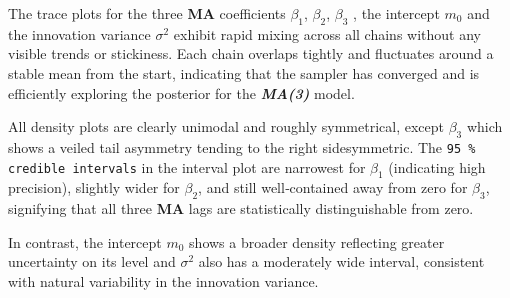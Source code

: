 \documentclass{Configuration_Files/PoliMi3i_thesis}
\begin{document}
\newpage
The trace plots for the three \textbf{\textbf{MA}} coefficients \(\beta_1\), \(\beta_2\),  \(\beta_3\) , the intercept \(m_0\) and the innovation variance \(\sigma^2\) exhibit rapid mixing across all chains without any visible trends or stickiness. Each chain overlaps tightly and fluctuates around a stable mean from the start, indicating that the sampler has converged and is efficiently exploring the posterior for the \textbf{\textit{MA(3)}} model.

All density plots are clearly unimodal and roughly symmetrical, except \(\beta_3\) which shows a veiled tail asymmetry tending to the right sidesymmetric. The \texttt{95 \% credible intervals} in the interval plot are narrowest for \(\beta_1\) (indicating high precision), slightly wider for \(\beta_2\), and still well‐contained away from zero for \(\beta_3\), signifying that all three \textbf{\textbf{MA}} lags are statistically distinguishable from zero. 

In contrast, the intercept \(m_0\) shows a broader density reflecting greater uncertainty on its level and \(\sigma^2\) also has a moderately wide interval, consistent with natural variability in the innovation variance.
\end{document}
